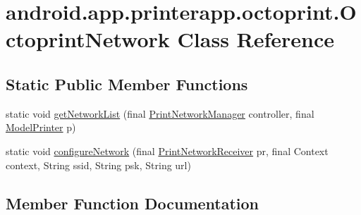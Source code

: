 \hypertarget{classandroid_1_1app_1_1printerapp_1_1octoprint_1_1_octoprint_network}{}\section{android.\+app.\+printerapp.\+octoprint.\+Octoprint\+Network Class Reference}
\label{classandroid_1_1app_1_1printerapp_1_1octoprint_1_1_octoprint_network}
\subsection*{Static Public Member Functions}
\begin{DoxyCompactItemize}
\item 
static void \hyperlink{classandroid_1_1app_1_1printerapp_1_1octoprint_1_1_octoprint_network_aa88423c674e83b62be857a6b30c44f94}{get\+Network\+List} (final \hyperlink{classandroid_1_1app_1_1printerapp_1_1devices_1_1discovery_1_1_print_network_manager}{Print\+Network\+Manager} controller, final \hyperlink{classandroid_1_1app_1_1printerapp_1_1model_1_1_model_printer}{Model\+Printer} p)
\item 
static void \hyperlink{classandroid_1_1app_1_1printerapp_1_1octoprint_1_1_octoprint_network_ab2cf0d08eb0fbbcf0b605c102bcc4b3a}{configure\+Network} (final \hyperlink{classandroid_1_1app_1_1printerapp_1_1devices_1_1discovery_1_1_print_network_receiver}{Print\+Network\+Receiver} pr, final Context context, String ssid, String psk, String url)
\end{DoxyCompactItemize}


\subsection{Member Function Documentation}
\mbox{\label{classandroid_1_1app_1_1printerapp_1_1octoprint_1_1_octoprint_network_ab2cf0d08eb0fbbcf0b605c102bcc4b3a}} 
